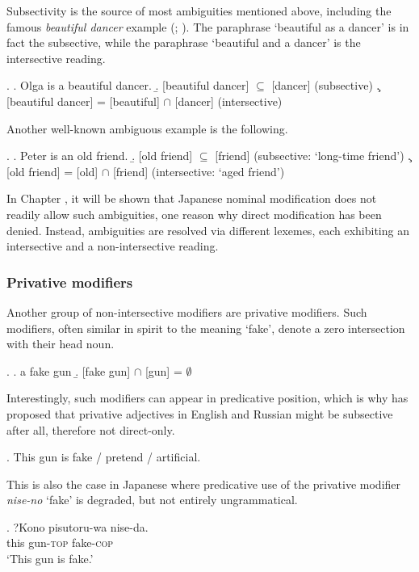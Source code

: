 \documentclass [output=book,colorlinks,citecolor=brown]{langscibook}
\begin{document}
Subsectivity is the source of most ambiguities mentioned above, including the famous \textit{beautiful dancer} example (\citealt[145]{larson:1995:olga}; \citealt{vendler:1957:verbs, siegel:1976:capturing}). The paraphrase `beautiful as a dancer’ is in fact the subsective, while the paraphrase `beautiful and a dancer’ is the intersective reading.

\ex. \a. Olga is a beautiful dancer.
\b. [beautiful dancer] $\subseteq$ [dancer] (subsective)
\c. [beautiful dancer] = [beautiful] $\cap$ [dancer] (intersective)

Another well-known ambiguous example is the following.

\ex. \a. Peter is an old friend. \hfill \citep[146]{larson:1998:events}
\b. [old friend] $\subseteq$ [friend] (subsective: `long-time friend’)
\c. [old friend] = [old] $\cap$ [friend] (intersective: `aged friend’)

In Chapter , it will be shown that Japanese nominal modification does not readily allow such ambiguities, one reason why direct modification has been denied. Instead, ambiguities are resolved via different lexemes, each exhibiting an intersective and a non-intersective reading.

\subsubsection{Privative modifiers}

Another group of non-intersective modifiers are privative modifiers. Such modifiers, often similar in spirit to the meaning `fake’, denote a zero intersection with their head noun. %

\ex. \a. a fake gun
\b. [fake gun] $\cap$ [gun] = $\emptyset$ \hfill \citep[25]{morzycki:2016:mod}

Interestingly, such modifiers can appear in predicative position, which is why \citet{partee:2009:formal} has proposed that privative adjectives in English and Russian might be subsective after all, therefore not direct-only.

\ex. This gun is fake / pretend / artificial. \hfill \citep[25]{morzycki:2016:mod}

This is also the case in Japanese where predicative use of the privative modifier \textit{nise-no} `fake' is degraded, but not entirely ungrammatical.

\exg. ?Kono pisutoru-wa nise-da.\\
this gun-\textsc{top} fake-\textsc{cop}\\
`This gun is fake.'
\end{document}
